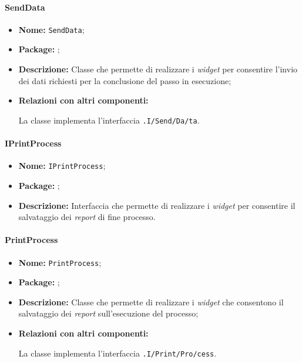 \paragraph{SendData}
\begin{flushleft}
\begin{itemize}
\item \textbf{Nome:} \texttt{SendData};
\item \textbf{Package:} \texttt{\viewUser{}};
\item \textbf{Descrizione:} Classe che permette di realizzare i \textit{widget} per consentire l'invio dei dati richiesti per la conclusione del passo in esecuzione;
\item \textbf{Relazioni con altri componenti:}
\begin{sloppypar}
La classe implementa l'interfaccia \texttt{\viewUser{}.I\fshyp{}Send\fshyp{}Da\fshyp{}ta}.
\end{sloppypar}
\end{itemize}
\end{flushleft}

\paragraph{IPrintProcess}
\begin{itemize}
\item \textbf{Nome:} \texttt{IPrintProcess};
\item \textbf{Package:} \texttt{\viewUser{}};
\item \textbf{Descrizione:} Interfaccia che permette di realizzare i \textit{widget} per consentire il salvataggio dei \textit{report} di fine processo.
\end{itemize}

\paragraph{PrintProcess}
\begin{flushleft}
\begin{itemize}
\item \textbf{Nome:} \texttt{PrintProcess};
\item \textbf{Package:} \texttt{\viewUser{}};
\item \textbf{Descrizione:} Classe che permette di realizzare i \textit{widget} che consentono il salvataggio dei \textit{report} sull'esecuzione del processo;
\item \textbf{Relazioni con altri componenti:}
\begin{sloppypar}
La classe implementa l'interfaccia \texttt{\viewUser{}.I\fshyp{}Print\fshyp{}Pro\fshyp{}cess}.
\end{sloppypar}
\end{itemize}
\end{flushleft}
